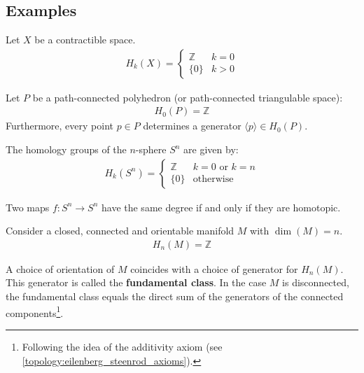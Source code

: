 \subsection{Examples}

	\begin{example}
		Let $X$ be a contractible space.
		\begin{gather}
			H_k(X) = \begin{cases}
				\mathbb{Z}&k=0\\
				\{0\}&k>0
			\end{cases}
		\end{gather}
	\end{example}
	\begin{example}
		Let $P$ be a path-connected polyhedron (or path-connected triangulable space):
		\begin{gather}
			H_0(P) = \mathbb{Z}
		\end{gather}
		Furthermore, every point $p\in P$ determines a generator $\langle p \rangle\in H_0(P)$.
	\end{example}
	\begin{example}
		The homology groups of the $n$-sphere $S^n$ are given by:
		\begin{gather}
			H_k(S^n)=\begin{cases}
				\mathbb{Z}&k=0\text{ or }k=n\\
				\{0\}&\text{otherwise}
			\end{cases}
		\end{gather}
	\end{example}
	\begin{property}
		Two maps $f:S^n\rightarrow S^n$ have the same degree if and only if they are homotopic.
	\end{property}
	
	\begin{example}
		Consider a closed, connected and orientable manifold $M$ with $\dim(M) = n$.
		\begin{gather}
			H_n(M) = \mathbb{Z}
		\end{gather}
	\end{example}
	\begin{result}[Orientation]
		A choice of orientation of $M$ coincides with a choice of generator for $H_n(M)$. This generator is called the \textbf{fundamental class}. In the case $M$ is disconnected, the fundamental class equals the direct sum of the generators of the connected components\footnote{Following the idea of the additivity axiom (see \ref{topology:eilenberg_steenrod_axioms}).}.
	\end{result}

